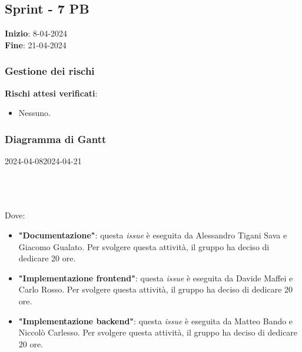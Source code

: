 \subsection{Sprint - 7 PB}
\textbf{Inizio}: 8-04-2024 \\
\textbf{Fine}: 21-04-2024

\subsubsection{Gestione dei rischi}
\textbf{Rischi attesi verificati}:

\begin{itemize}
	\item Nessuno.
\end{itemize}

\subsubsection{Diagramma di Gantt}

\begin{ganttchart}[
		x unit=0.6cm, %
		y unit chart=0.6cm,
		bar/.style={fill=blue!50},
		bar height=0.5,
		time slot format=isodate,
		time slot unit=day,
		vgrid,
		today=2024-04-08,
		today rule/.style={draw=red, ultra thick}
	]{2024-04-08}{2024-04-21}
	 \\
	 \\
	 \\
	 \\
\end{ganttchart}

Dove:
\begin{itemize}
	\item \textbf{"Documentazione"}: questa \textit{issue} è eseguita da
	      Alessandro Tigani Sava e Giacomo Gualato. Per svolgere questa attività, il gruppo ha deciso di
	      dedicare 20 ore.
	\item \textbf{"Implementazione frontend"}: questa \textit{issue} è eseguita
	      da Davide Maffei e Carlo Rosso. Per svolgere questa attività, il
	      gruppo ha deciso di dedicare 20 ore.
	\item \textbf{"Implementazione backend"}: questa \textit{issue} è eseguita da Matteo Bando e Niccolò Carlesso. Per svolgere questa attività, il
	      gruppo ha deciso di dedicare 20 ore.
\end{itemize}

